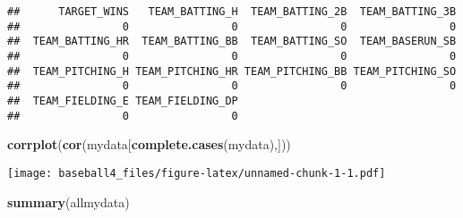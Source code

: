\documentclass[
]{article}
\newenvironment{Shaded}{\begin{snugshade}}{\end{snugshade}}
\newcommand{\KeywordTok}[1]{\textcolor[rgb]{0.13,0.29,0.53}{\textbf{#1}}}
\newcommand{\NormalTok}[1]{#1}
\begin{document}
\begin{verbatim}
##      TARGET_WINS   TEAM_BATTING_H  TEAM_BATTING_2B  TEAM_BATTING_3B 
##                0                0                0                0 
##  TEAM_BATTING_HR  TEAM_BATTING_BB  TEAM_BATTING_SO  TEAM_BASERUN_SB 
##                0                0                0                0 
##  TEAM_PITCHING_H TEAM_PITCHING_HR TEAM_PITCHING_BB TEAM_PITCHING_SO 
##                0                0                0                0 
##  TEAM_FIELDING_E TEAM_FIELDING_DP 
##                0                0
\end{verbatim}

\begin{Shaded}
\begin{Highlighting}[]
\KeywordTok{corrplot}\NormalTok{(}\KeywordTok{cor}\NormalTok{(mydata[}\KeywordTok{complete.cases}\NormalTok{(mydata),]))}
\end{Highlighting}
\end{Shaded}

\texttt{[image: baseball4\_files/figure-latex/unnamed-chunk-1-1.pdf]}

\begin{Shaded}
\begin{Highlighting}[]
\KeywordTok{summary}\NormalTok{(allmydata)}
\end{Highlighting}
\end{Shaded}
\end{document}
